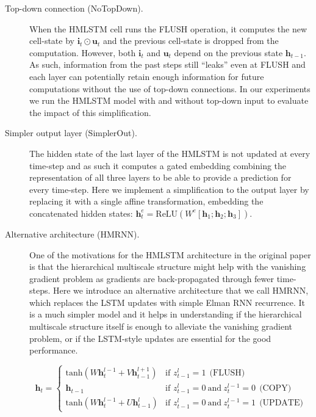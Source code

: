 \begin{description}
\item[Top-down connection (NoTopDown).]
When the HMLSTM cell runs the FLUSH operation, it computes
the new cell-state by $\mathbf{i}_t \odot \mathbf{u}_t$ and the 
previous cell-state is dropped from the computation.
However, both $\mathbf{i}_t$ and $\mathbf{u}_t$ depend on the previous
state $\mathbf{h}_{t-1}$. As such, information from the past steps still ``leaks'' 
even at FLUSH and each layer can potentially retain enough information 
for future computations without the use of top-down connections. 
In our experiments we run the HMLSTM model with and without top-down
input to evaluate the impact of this simplification.

\item[Simpler output layer (SimplerOut).]
The hidden state of the last layer of the HMLSTM is not updated 
at every time-step and as such it computes a gated embedding 
combining the representation of all three layers to be able 
to provide a prediction for every time-step.  
Here we implement a simplification to the output layer by replacing 
it with a single affine transformation, embedding the concatenated 
hidden states: $\mathbf{h}^e_t = \text{ReLU}(W^e [\mathbf{h}_1; \mathbf{h}_2; \mathbf{h}_3])$.

\item[Alternative architecture (HMRNN).]
One of the motivations for the HMLSTM architecture in the original paper 
\citep{chung2016hierarchical} is that the hierarchical multiscale 
structure might help with the vanishing gradient problem as gradients 
are back-propagated through fewer time-steps. Here we introduce an alternative
architecture that we call HMRNN, which replaces the LSTM updates with 
simple Elman RNN recurrence. 
It is a much simpler model and it helps in understanding if the hierarchical 
multiscale structure itself is enough to alleviate the vanishing gradient 
problem, or if the LSTM-style updates are essential for the good performance. 

\begin{equation}
    \mathbf{h}_t = \begin{cases}  
             \text{tanh}(W \mathbf{h}^{l-1}_t + V\mathbf{h}^{l+1}_{t-1} ) & \mbox{if } z^l_{t-1} = 1 \: \: \text{(FLUSH)}\\
 \mathbf{h}_{t-1} &  \mbox{if } z^l_{t-1} = 0 \: \mbox{and} \:  z^{l-1}_t = 0  \: \: \text{(COPY)}\\
    \text{tanh}(W \mathbf{h}^{l-1}_t + U \mathbf{h}^{l}_{t-1}) &
            \mbox{if } z^l_{t-1} = 0 \: \mbox{and} \:  z^{l-1}_t = 1  \: \: \text{(UPDATE)}
            \end{cases} 
\end{equation}


\end{description}
